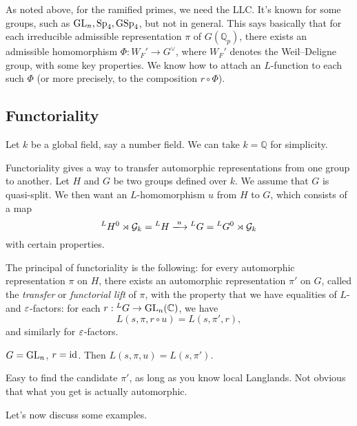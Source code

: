 \documentclass[reqno]{amsart} 
\begin{document}
As noted above, for the ramified primes, we need the LLC.  It's known for some groups, such as $\operatorname{GL}_n, \operatorname{Sp}_4, \operatorname{GSp}_4$, but not in general.  This says basically that for each irreducible admissible representation $\pi$ of $G(\mathbb{Q}_p)$, there exists an admissible homomorphism $\Phi : W_F' \rightarrow G^\vee$, where $W_F'$ denotes the Weil--Deligne group, with some key properties.  We know how to attach an $L$-function to each such $\Phi$ (or more precisely, to the composition $r \circ \Phi$).

\subsection{Functoriality}
Let $k$ be a global field, say a number field.  We can take $k = \mathbb{Q}$ for simplicity.

Functoriality gives a way to transfer automorphic representations from one group to another.  Let $H$ and $G$ be two groups defined over $k$.  We assume that $G$ is quasi-split.  We then want an $L$-homomorphism $u$ from $H$ to $G$, which consists of a map
\begin{equation*}
 {}^L H^0 \rtimes \mathcal{G}_k = {}^L H
 \xlongrightarrow{u} {}^L G = {}^L G^0 \rtimes \mathcal{G}_k
\end{equation*}
with certain properties.

The principal of functoriality is the following: for every automorphic representation $\pi$ on $H$, there exists an automorphic representation $\pi '$ on $G$, called the \emph{transfer} or \emph{functorial lift} of $\pi$, with the property that we have equalities of $L$- and $\varepsilon$-factors: for each $r : {}^L G \rightarrow \operatorname{GL}_n(\mathbb{C})$, we have
\begin{equation*}
  L(s, \pi , r \circ u)
  =
  L(s, \pi' , r),
\end{equation*}
and similarly for $\varepsilon$-factors.

\begin{example}
  $G = \operatorname{GL}_n$, $r = \operatorname{id}$.  Then $L(s, \pi, u) = L(s, \pi ')$.
\end{example}

\begin{remark}
  Easy to find the candidate $\pi '$, as long as you know local Langlands.  Not obvious that what you get is actually automorphic.
\end{remark}

Let's now discuss some examples.
\end{document}
